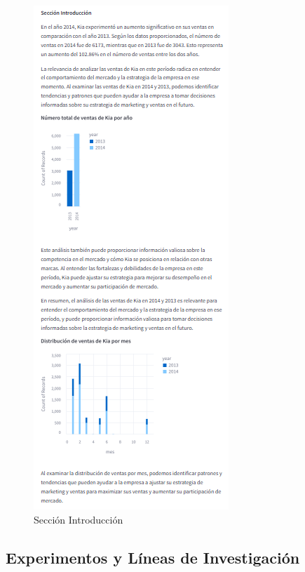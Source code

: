 \begin{figure}[H] %
	\centering %
	\begin{minipage}{0.48\textwidth} %
		\centering
		\includegraphics[height=\textheight]{intro.png} %
		\caption{Sección Introducción}
		\label{fig:ejemplo_introduccion}
	\end{minipage}
\end{figure}




\subsection{Experimentos y Líneas de Investigación}

